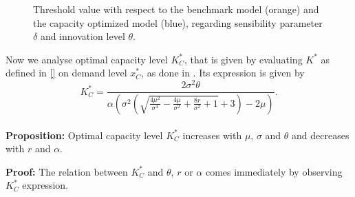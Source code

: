 \begin{figure}[!htb]
	\begin{subfigmatrix}{2}
	\end{subfigmatrix}
\caption{Threshold value with respect to the benchmark model (orange) and the capacity optimized model (blue), regarding sensibility parameter $\delta$ and innovation level $\theta$.}
\label{fig:td}
\end{figure}





Now we analyse optimal capacity level $K^*_C$, that is given by evaluating $K^*$ as defined in \eqref{} on demand level $x^*_C$, as done in \cite{huis:cap}. Its expression is given by
$$K^*_C=\frac{2 \sigma ^2 \theta}{\alpha \left(\sigma ^2 \left(\sqrt{\frac{4 \mu ^2}{\sigma ^4}-\frac{4 \mu }{\sigma ^2}+\frac{8 r}{\sigma ^2}+1}+3\right)-2 \mu \right)}.$$\\
\textbf{Proposition:}
Optimal capacity level $K^*_C$ increases with $\mu$, $\sigma$ and $\theta$ and decreases with $r$ and $\alpha$.

\textbf{Proof:}
The relation between $K^*_C$ and $\theta$, $r$ or $\alpha$ comes immediately by observing $K^*_C$ expression.

